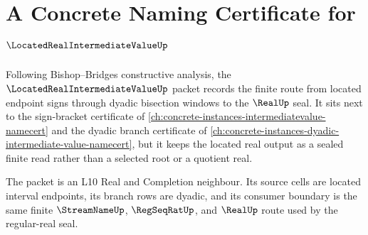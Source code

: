 \chapter{A Concrete Naming Certificate for $\LocatedRealIntermediateValueUp$}
\label{ch:concrete-instances-located-real-intermediate-value-namecert}

Following Bishop--Bridges constructive analysis, the $\LocatedRealIntermediateValueUp$ packet records the finite route from located endpoint signs through dyadic bisection windows to the $\RealUp$ seal. It sits next to the sign-bracket certificate of \autoref{ch:concrete-instances-intermediatevalue-namecert} and the dyadic branch certificate of \autoref{ch:concrete-instances-dyadic-intermediate-value-namecert}, but it keeps the located real output as a sealed finite read rather than a selected root or a quotient real.

The packet is an L10 Real and Completion neighbour. Its source cells are located interval endpoints, its branch rows are dyadic, and its consumer boundary is the same finite $\StreamNameUp$, $\RegSeqRatUp$, and $\RealUp$ route used by the regular-real seal.

